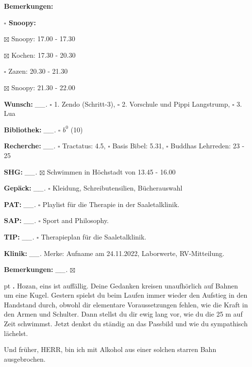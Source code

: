\documentclass[10pt,a4paper]{article}
\newcounter{notec}
\newcommand\notep[1]{%
  \stepcounter{notec}
  \vskip #1pt
  {\bf\arabic{notec}.}
}
\newcommand\prop[1] {{\color {alizarin} {\bf #1}}}             %
\newcommand\opti[1] {{\color {amethyst} {\bf #1}}}             %
\newcommand\mand[1] {{\color {burntorange} {\bf #1}}}          %
\newcommand\bottomspace{\vskip 4pt}
\newcommand\n[1] { {\sl #1.} \hskip 5pt }
\begin{document}
\begin{mdframed}[style=daystyle]
\begin{labeling}{{\mand {Bemerkungen:}}}
\begin{minipage}{0.75\textwidth}
\begin{labeling}{\prop {$\square$ {Snoopy:}}}
      \item[$\boxtimes$ Snoopy:] 17.00 - 17.30
      \item[$\boxtimes$ Kochen:] 17.30 - 20.30
        
      \item[$\square$ Zazen:]  20.30 - 21.30
      \item[$\boxtimes$ Snoopy:] 21.30 - 22.00
      \end{labeling}
    \end{minipage}
    \bottomspace
  \item[{\mand {Wunsch:}}]       \n{\_\_} $\square$ 1. Zendo (Schritt-3),
      $\square$ 2. Vorschule und Pippi Langstrump, $\square$ 3. Lua
  \item[{\mand {Bibliothek:}}]   \n{\_\_} $\square$ $b^{0}$ (10)
  \item[{\mand {Recherche:}}]    \n{\_\_} $\square$ Tractatus: 4.5, $\square$ Basis Bibel: 5.31,
      $\square$ Buddhas Lehrreden: 23 - 25
  \item[{\mand {SHG:}}]          \n{\_\_} $\boxtimes$ Schwimmen in Höchstadt von 13.45 - 16.00
  \item[{\mand {Gepäck:}}]       \n{\_\_} $\square$ Kleidung, Schreibutensilien, Bücherauswahl
  \item[{\opti {PAT:}}]          \n{\_\_} $\square$ Playlist für die Therapie in der Saaletalklinik.
  \item[{\opti {SAP:}}]          \n{\_\_} $\square$ Sport and Philosophy.
  \item[{\opti {TIP:}}]          \n{\_\_} $\square$ Therapieplan für die Saaletalklinik.
  \item[{\opti {Klinik:}}]       \n{\_\_} Merke: Aufname am 24.11.2022, Laborwerte, RV-Mitteilung.
  \item[{\mand {Bemerkungen:}}]  \n{\_\_} $\boxtimes$
  \end{labeling}
    
  \setcounter{notec}{0}
  
  \notep 0 Hozan, eins ist auffällig. Deine Gedanken kreisen unaufhörlich auf
  Bahnen um eine Kugel. Gestern spielst du beim Laufen immer wieder den Aufstieg
  in den Handstand durch, obwohl dir elementare Voraussetzungen fehlen, wie
  die Kraft in den Armen und Schulter. Dann stellst du dir ewig lang vor, wie du
  die 25 m auf Zeit schwimmst. Jetzt denkst du ständig an das Passbild und wie
  du sympathisch lächelst.

  \vskip 2pt
  Und früher, HERR, bin ich mit Alkohol aus einer solchen starren Bahn
  ausgebrochen.


\end{mdframed}
\end{document}
